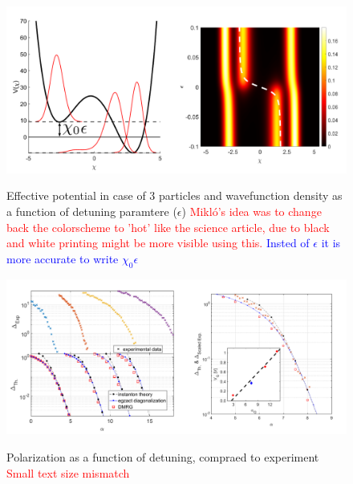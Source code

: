 \documentclass[aps,prb, 10pt]{revtex4-2}
\begin{document}
\begin{figure}[h]
\centering
\includegraphics[page=1,width=1\textwidth]{figure1plus2}
\label{1stImage}
\caption{Effective potential in case of 3 particles and wavefunction density as a function of detuning paramtere ($\epsilon$) {\textcolor{red}{Mikló's idea was to change back the colorscheme to 'hot' like the science article, due to black and white printing might be more visible using this.}} {\textcolor{blue}{Insted of $\epsilon$ it is more accurate to write $\chi_0 \epsilon$}}}
\end{figure}

\begin{figure}[h]
\centering
\includegraphics[page=1,width=1\textwidth]{figure3plus4}
\label{2ndImage}
\caption{Polarization as a function of detuning, compraed to experiment {\textcolor{red}{Small text size mismatch}}}
\end{figure}
\end{document}
